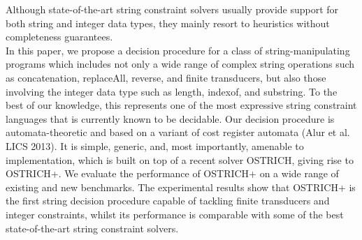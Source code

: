 Although state-of-the-art string constraint solvers usually provide support for both string and integer data types,   
they mainly resort to heuristics without completeness guarantees. \\ %
%
In this paper, we propose a decision procedure 
for a class of string-manipulating programs
which includes  not only a wide range of complex string operations such as concatenation, replaceAll, reverse, and finite transducers, but also those involving the integer data type such as length, indexof, and substring. To the best of our knowledge, this represents one of the most expressive string constraint languages that is currently known to be decidable.  Our decision procedure is automata-theoretic and based on a variant of cost register automata (Alur et al. LICS 2013). 
It is simple, generic, and, most importantly, amenable to implementation, which 
is built on top of a recent solver OSTRICH,
giving rise to OSTRICH+.
We evaluate the performance of OSTRICH+ on  a wide range of existing and new benchmarks. The experimental results show that OSTRICH+ is the first string decision procedure capable of tackling finite transducers and integer constraints, whilst
its performance is comparable with some of the best state-of-the-art string constraint solvers.
